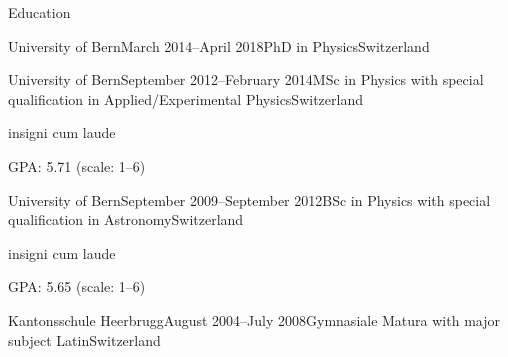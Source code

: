 \documentclass{resume} %
\begin{document}

\begin{rSection}{Education}
	\begin{nlSubsection}{University of Bern}{March 2014--April 2018}{PhD in Physics}{Switzerland}
	\end{nlSubsection}
	\begin{rSubsection}{University of Bern}{September 2012--February 2014}{MSc in Physics with special qualification in Applied/Experimental Physics}{Switzerland}
		\item insigni cum laude
		\item GPA: \num{5.71} (scale: \numrange{1}{6})
	\end{rSubsection}
	\begin{rSubsection}{University of Bern}{September 2009--September 2012}{BSc in Physics with special qualification in Astronomy}{Switzerland}
		\item insigni cum laude
		\item GPA: \num{5.65} (scale: \numrange{1}{6})
	\end{rSubsection}
	\begin{nlSubsection}{Kantonsschule Heerbrugg}{August 2004--July 2008}{Gymnasiale Matura with major subject Latin}{Switzerland}
	\end{nlSubsection}
\end{rSection}
\end{document}
